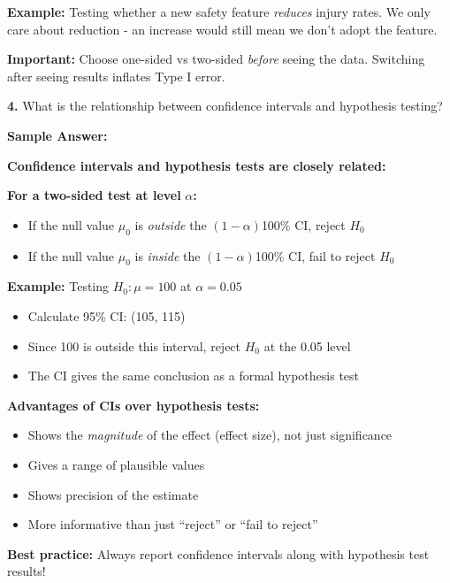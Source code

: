 \documentclass[11pt]{article}
\begin{document}
\textbf{Example:} Testing whether a new safety feature \textit{reduces} injury rates. We only care about reduction - an increase would still mean we don't adopt the feature.

\textbf{Important:} Choose one-sided vs two-sided \textit{before} seeing the data. Switching after seeing results inflates Type I error.

\vspace{6pt}

\textbf{4.} What is the relationship between confidence intervals and hypothesis testing?

\textcolor{answergreen}{\textbf{Sample Answer:}}

\textbf{Confidence intervals and hypothesis tests are closely related:}

\textbf{For a two-sided test at level} $\alpha$\textbf{:}
\begin{itemize}
\item If the null value $\mu_0$ is \textit{outside} the $(1-\alpha)$100\% CI, reject $H_0$
\item If the null value $\mu_0$ is \textit{inside} the $(1-\alpha)$100\% CI, fail to reject $H_0$
\end{itemize}

\textbf{Example:} Testing $H_0: \mu = 100$ at $\alpha = 0.05$
\begin{itemize}
\item Calculate 95\% CI: (105, 115)
\item Since 100 is outside this interval, reject $H_0$ at the 0.05 level
\item The CI gives the same conclusion as a formal hypothesis test
\end{itemize}

\textbf{Advantages of CIs over hypothesis tests:}
\begin{itemize}
\item Shows the \textit{magnitude} of the effect (effect size), not just significance
\item Gives a range of plausible values
\item Shows precision of the estimate
\item More informative than just ``reject'' or ``fail to reject''
\end{itemize}

\textbf{Best practice:} Always report confidence intervals along with hypothesis test results!
\end{document}
